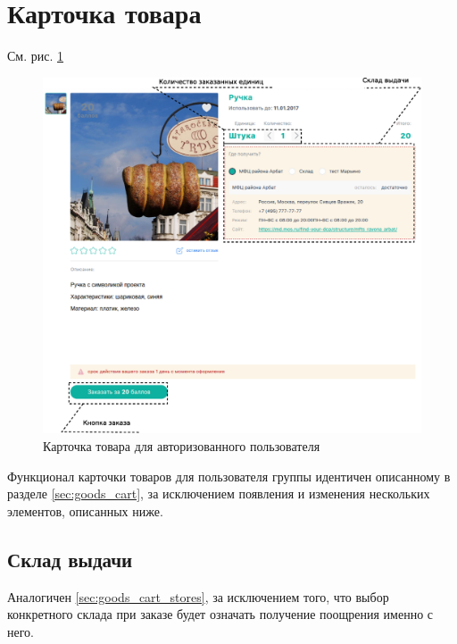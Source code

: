         
     \section{Карточка товара}

        См. рис. \ref{fig:auth_goods_cart}
            \begin{figure}
                \center
                \includegraphics[width=170mm]{04_auth_funcs/figures/05.eps}
                \caption{Карточка товара для авторизованного пользователя}
                \label{fig:auth_goods_cart}
            \end{figure}
                
 
        Функционал карточки товаров для пользователя группы 
        идентичен описанному в разделе \ref{sec:goods_cart}, за исключением
        появления и изменения нескольких элементов, описанных ниже.
     
        \subsection{Склад выдачи}\label{sec:auth_cart_store}

            Аналогичен \ref{sec:goods_cart_stores}, за исключением того, что 
            выбор конкретного склада при заказе будет означать получение 
            поощрения именно с него.


